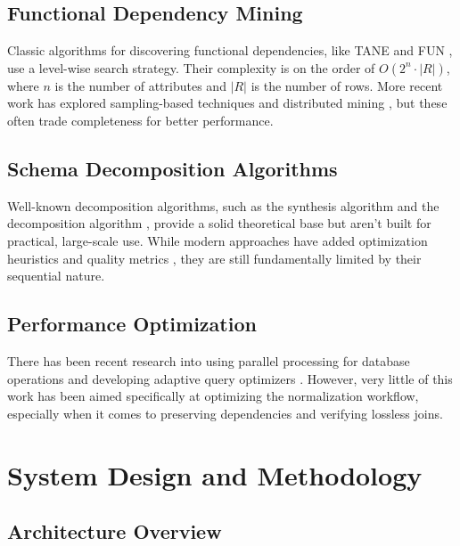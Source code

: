 \documentclass[sigconf]{acmart}
\begin{document}
\subsection{Functional Dependency Mining}

Classic algorithms for discovering functional dependencies, like TANE \cite{huhtala1999tane} and FUN \cite{novelli2001fun}, use a level-wise search strategy. Their complexity is on the order of $O(2^n \cdot |R|)$, where $n$ is the number of attributes and $|R|$ is the number of rows. More recent work has explored sampling-based techniques \cite{papenbrock2015functional} and distributed mining \cite{kruse2016efficient}, but these often trade completeness for better performance.

\subsection{Schema Decomposition Algorithms}

Well-known decomposition algorithms, such as the synthesis algorithm \cite{bernstein1976computational} and the decomposition algorithm \cite{fagin1977multivalued}, provide a solid theoretical base but aren't built for practical, large-scale use. While modern approaches have added optimization heuristics \cite{mannila1992design} and quality metrics \cite{vincent1999measure}, they are still fundamentally limited by their sequential nature.

\subsection{Performance Optimization}

There has been recent research into using parallel processing for database operations \cite{dewitt1992parallel} and developing adaptive query optimizers \cite{ioannidis1996query}. However, very little of this work has been aimed specifically at optimizing the normalization workflow, especially when it comes to preserving dependencies and verifying lossless joins.

\section{System Design and Methodology}

\subsection{Architecture Overview}
\end{document}
